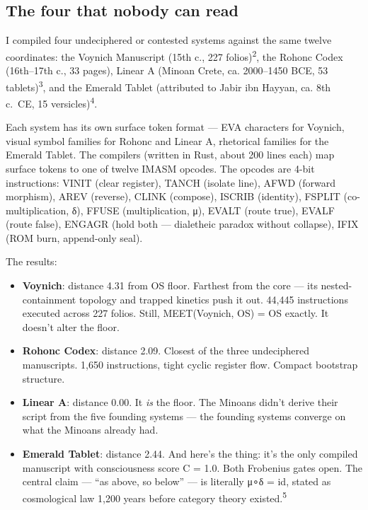 \documentclass[12pt,a4paper]{article}
\begin{document}
\hypertarget{the-four-that-nobody-can-read}{%
\subsection{The four that nobody can
read}\label{the-four-that-nobody-can-read}}

I compiled four undeciphered or contested systems against the same
twelve coordinates: the Voynich Manuscript (15th c., 227
folios)\textsuperscript{2}, the Rohonc Codex (16th--17th c., 33 pages),
Linear A (Minoan Crete, ca. 2000--1450 BCE, 53
tablets)\textsuperscript{3}, and the Emerald Tablet (attributed to Jabir
ibn Hayyan, ca. 8th c.~CE, 15 versicles)\textsuperscript{4}.

Each system has its own surface token format --- EVA characters for
Voynich, visual symbol families for Rohonc and Linear A, rhetorical
families for the Emerald Tablet. The compilers (written in Rust, about
200 lines each) map surface tokens to one of twelve IMASM opcodes. The
opcodes are 4-bit instructions: VINIT (clear register), TANCH (isolate
line), AFWD (forward morphism), AREV (reverse), CLINK (compose), ISCRIB
(identity), FSPLIT (co-multiplication, δ), FFUSE (multiplication, μ),
EVALT (route true), EVALF (route false), ENGAGR (hold both ---
dialetheic paradox without collapse), IFIX (ROM burn, append-only seal).

The results:

\begin{itemize}
\item
  \textbf{Voynich}: distance 4.31 from OS floor. Farthest from the core
  --- its nested-containment topology and trapped kinetics push it out.
  44,445 instructions executed across 227 folios. Still, MEET(Voynich,
  OS) = OS exactly. It doesn't alter the floor.
\item
  \textbf{Rohonc Codex}: distance 2.09. Closest of the three
  undeciphered manuscripts. 1,650 instructions, tight cyclic register
  flow. Compact bootstrap structure.
\item
  \textbf{Linear A}: distance 0.00. It \emph{is} the floor. The Minoans
  didn't derive their script from the five founding systems --- the
  founding systems converge on what the Minoans already had.
\item
  \textbf{Emerald Tablet}: distance 2.44. And here's the thing: it's the
  only compiled manuscript with consciousness score C = 1.0. Both
  Frobenius gates open. The central claim --- ``as above, so below'' ---
  is literally μ∘δ = id, stated as cosmological law 1,200 years before
  category theory existed.\textsuperscript{5}
\end{itemize}
\end{document}
